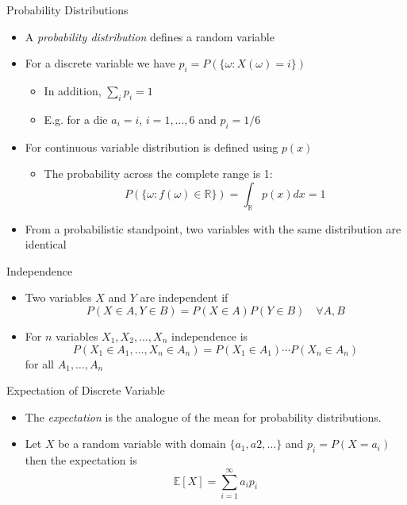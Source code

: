 \documentclass{beamer}
\begin{document}
\begin{frame}{Probability Distributions} 
\begin{itemize}
\item A \emph{probability distribution} defines a random variable 
\item For a discrete variable we have $p_i = P(\{\omega: X(\omega) = i\})$
\begin{itemize}
\item In addition, $\sum_i p_i  = 1$
\item E.g. for a die $a_i = i$, $i=1,\ldots, 6$ and $p_i = 1/6$
\end{itemize}
\item For continuous variable distribution is defined using $p(x)$
\begin{itemize}
\item The probability across the complete range is 1: 
\begin{displaymath}
P(\{\omega: f(\omega) \in \mathbb{R}\}) = \int_\mathbb{R} p(x) dx = 1
\end{displaymath} 
\end{itemize}
\item From a probabilistic standpoint, two variables with the same distribution are identical 
\end{itemize}
\end{frame}

\begin{frame}{Independence}  
\begin{itemize} 
 \item Two variables $X$ and $Y$ are independent if 
 \begin{displaymath} 
  P(X \in A, Y \in B) = P(X \in A)P(Y \in B) \quad \forall A, B
 \end{displaymath}
\item For $n$ variables $X_1, X_2, \ldots, X_n$ independence is 
 \begin{displaymath} 
  P(X_1 \in A_1, \ldots, X_n \in A_n) = P(X_1 \in A_1) \cdots P(X_n \in A_n)
 \end{displaymath}
 for all $A_1, \ldots, A_n$ 
\end{itemize}
\end{frame}

\begin{frame}{Expectation of Discrete Variable} 
\begin{itemize} 
 \item The \emph{expectation} is the analogue of the mean for probability distributions.
 \item Let $X$ be a random variable with domain $\{a_1, a2, \ldots \}$ and $p_i = P(X = a_i)$ then the expectation is 
 \begin{displaymath} 
  \mathbb{E}[X] = \sum_{i=1}^\infty a_i p_i
 \end{displaymath}
\end{itemize}
\end{frame}
\end{document}
